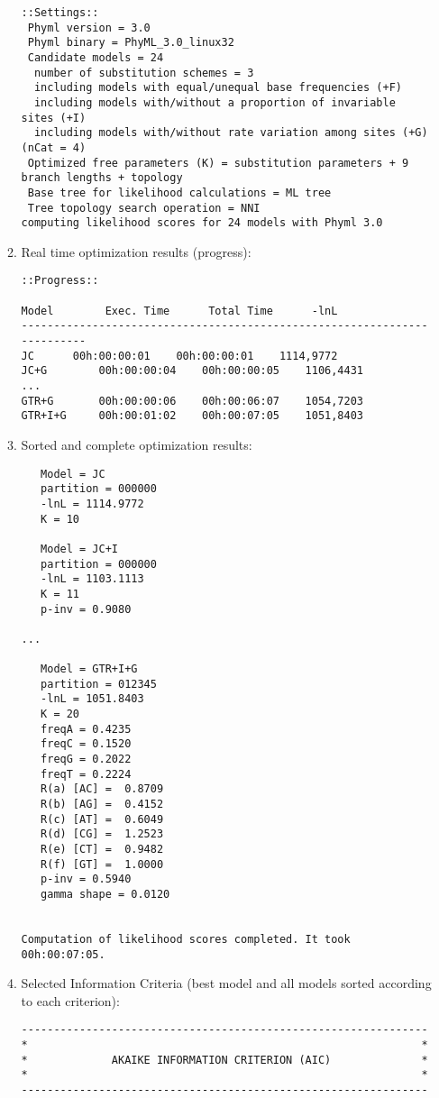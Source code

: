 \documentclass[11pt,twoside,a4paper]{article}
\begin{document}
\begin{enumerate}
\begin{enumerate}
\begin{lstlisting}
::Settings::
 Phyml version = 3.0
 Phyml binary = PhyML_3.0_linux32
 Candidate models = 24
  number of substitution schemes = 3
  including models with equal/unequal base frequencies (+F)
  including models with/without a proportion of invariable sites (+I)
  including models with/without rate variation among sites (+G) (nCat = 4)
 Optimized free parameters (K) = substitution parameters + 9 branch lengths + topology 
 Base tree for likelihood calculations = ML tree
 Tree topology search operation = NNI
computing likelihood scores for 24 models with Phyml 3.0
\end{lstlisting}

\item Real time optimization results (progress):

\begin{lstlisting}
::Progress::

Model 		 Exec. Time 	 Total Time 	 -lnL
-------------------------------------------------------------------------
JC		00h:00:00:01	00h:00:00:01	1114,9772
JC+G		00h:00:00:04	00h:00:00:05	1106,4431
...
GTR+G		00h:00:00:06	00h:00:06:07	1054,7203
GTR+I+G		00h:00:01:02	00h:00:07:05	1051,8403
\end{lstlisting}

\item Sorted and complete optimization results:

\begin{lstlisting}
   Model = JC
   partition = 000000
   -lnL = 1114.9772
   K = 10 
 
   Model = JC+I
   partition = 000000
   -lnL = 1103.1113
   K = 11
   p-inv = 0.9080 

...

   Model = GTR+I+G
   partition = 012345
   -lnL = 1051.8403
   K = 20
   freqA = 0.4235 
   freqC = 0.1520 
   freqG = 0.2022 
   freqT = 0.2224 
   R(a) [AC] =  0.8709
   R(b) [AG] =  0.4152
   R(c) [AT] =  0.6049
   R(d) [CG] =  1.2523
   R(e) [CT] =  0.9482
   R(f) [GT] =  1.0000
   p-inv = 0.5940
   gamma shape = 0.0120 
 
 
Computation of likelihood scores completed. It took 00h:00:07:05.
\end{lstlisting}

\item Selected Information Criteria (best model and all models sorted according to each criterion):

\begin{lstlisting}
---------------------------------------------------------------
*                                                             *
*             AKAIKE INFORMATION CRITERION (AIC)              *
*                                                             *
---------------------------------------------------------------
 

\end{lstlisting}
\end{enumerate}
\end{enumerate}
\end{document}
